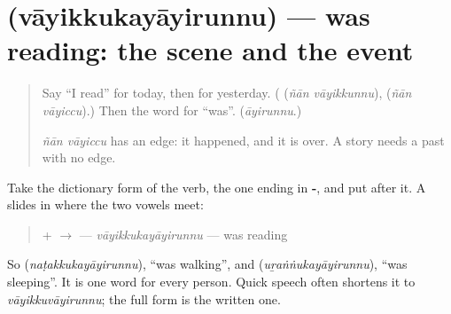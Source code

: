 \section[\texorpdfstring{\ml{വായിക്കുകയായിരുന്നു} (vāyikkukayāyirunnu)}{വായിക്കുകയായിരുന്നു (vāyikkukayāyirunnu)}]{ (vāyikkukayāyirunnu) — was reading: the scene and the event}

\label{lesson:ML-C339-vayikkukayayirunnu}



\begin{quote}
Say \textquotedblleft{}I read\textquotedblright{} for today, then for yesterday. (\textbf{ } (\emph{ñān vāyikkunnu}), \textbf{ } (\emph{ñān vāyiccu}).) Then the word for \textquotedblleft{}was\textquotedblright{}. (\emph{āyirunnu}.)

\emph{ñān vāyiccu} has an edge: it happened, and it is over. A story needs a past with no edge.
\end{quote}

\begin{grammarlens}[title={Grammar Lens: the dictionary form, then \ml{ആയിരുന്നു}}]
Take the dictionary form of the verb, the one ending in \textbf{-}, and put \textbf{} after it. A \textbf{} slides in where the two vowels meet:

\begin{quote}
 +  $\to$ \textbf{} — \emph{vāyikkukayāyirunnu} — was reading
\end{quote}

So \textbf{} (\emph{naṭakkukayāyirunnu}), \textquotedblleft{}was walking\textquotedblright{}, and \textbf{} (\emph{uṟaṅṅukayāyirunnu}), \textquotedblleft{}was sleeping\textquotedblright{}. It is one word for every person. Quick speech often shortens it to \emph{vāyikkuvāyirunnu}; the full form is the written one.
\end{grammarlens}

